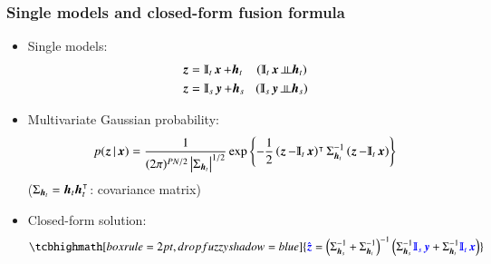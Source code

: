\documentclass{beamer}
\let\olditem\item
\renewcommand{\item}{\setlength{\itemsep}{\fill}\olditem}
\begin{document}
\begin{frame}
\frametitle{Single models and closed-form fusion formula} 
	\begin{itemize}\itemsep0em
		\item Single models:
		\begin{equation*}
			\begin{split}
			\z &= \varmathbb{I}_t\x+\boldsymbol{h}_t  \:\:\:\:\: (\varmathbb{I}_t\x \indep \boldsymbol{h}_t)\\
			\z &= \varmathbb{I}_s\y+\boldsymbol{h}_s \:\:\:\: (\varmathbb{I}_s\y \indep \boldsymbol{h}_s)	
			\end{split}	
		\end{equation*}
		
		\item Multivariate Gaussian probability: 
		\begin{equation*}
			p(\z|\x) = \frac{1}{(2\pi)^{\dimsh\dimth/2}\left| \Sigma_{\boldsymbol{h}_t} \right|^{1/2} } \exp \left\lbrace -\frac{1}{2} \left( \z-\varmathbb{I}_t\x \right)^{\mytrans} \Sigma_{\boldsymbol{h}_t}^{-1} \left( \z-\varmathbb{I}_t\x \right)\right\rbrace
		\end{equation*}	
		{\centering ($ \Sigma_{\boldsymbol{h}_t}= \boldsymbol{h}_t \boldsymbol{h}_t^{\intercal}$: covariance matrix)}
		
		\item Closed-form solution:
		\begin{equation*}
		\tcbhighmath[boxrule=2pt,drop fuzzy shadow=blue]{\textcolor{blue}{\hat{\z}}=\left(\Sigma_{\boldsymbol{h}_s}^{-1}+\Sigma_{\boldsymbol{h}_t}^{-1}\right)^{-1} \left(\Sigma_{\boldsymbol{h}_s}^{-1}\textcolor{blue}{\varmathbb{I}_s\y}+\Sigma_{\boldsymbol{h}_t}^{-1}\textcolor{blue}{\varmathbb{I}_t\x}\right)}
		\end{equation*} 	
	\end{itemize}
\end{frame}
\end{document}
